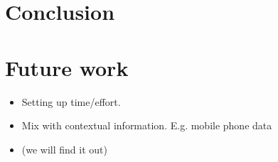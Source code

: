 \documentclass{article}
\begin{document}
    
    
    
%      
%      
%      
%      
%
%
%
%
%










\section{Conclusion}


\section{Future work}

\begin{itemize}
\item Setting up time/effort. 
\item Mix with contextual information. E.g. mobile phone data 
\item (we will find it out)
\end{itemize}





\end{document}
